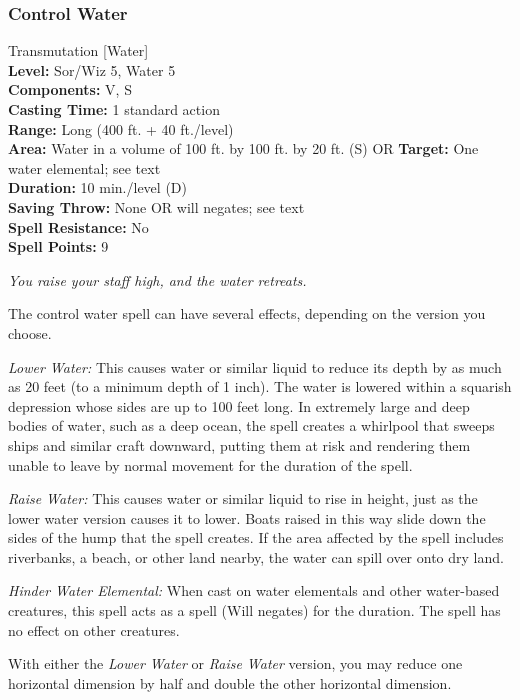 \subsubsection{Control Water}
\label{Spell:ControlWater}
Transmutation [Water]
\\ \textbf{Level:} Sor/Wiz 5, Water 5
\\ \textbf{Components:} V, S
\\ \textbf{Casting Time:} 1 standard action
\\ \textbf{Range:} Long (400 ft. + 40 ft./level)
\\ \textbf{Area:} Water in a volume of 100 ft. by 100 ft. by 20 ft. (S) OR \textbf{Target:} One water elemental; see text
\\ \textbf{Duration:} 10 min./level (D)
\\ \textbf{Saving Throw:} None OR will negates; see text
\\ \textbf{Spell Resistance:} No
\\ \textbf{Spell Points:} 9

\emph{You raise your staff high, and the water retreats.}

The control water spell can have several effects, depending on the version you choose.
\begin{list}{}{\leftmargin=1em}
 \item \emph{Lower Water:} This causes water or similar liquid to reduce its depth by as much as 20 feet (to a minimum depth of 1 inch). 
The water is lowered within a squarish depression whose sides are up to 100 feet long.
In extremely large and deep bodies of water, such as a deep ocean, the spell creates a whirlpool that sweeps ships and similar craft downward, 
putting them at risk and rendering them unable to leave by normal movement for the duration of the spell. 
 \item \emph{Raise Water:}
This causes water or similar liquid to rise in height, just as the lower water version causes it to lower. 
Boats raised in this way slide down the sides of the hump that the spell creates. 
If the area affected by the spell includes riverbanks, a beach, or other land nearby, the water can spill over onto dry land.
 \item \emph{Hinder Water Elemental:} 
When cast on water elementals and other water-based creatures, this spell acts as a  spell (Will negates) for the duration. 
The spell has no effect on other creatures.
\end{list}
With either the \emph{Lower Water} or \emph{Raise Water} version, you may reduce one horizontal dimension by half and double the other horizontal dimension. 

